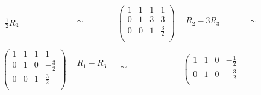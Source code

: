 \documentclass[12pt]{scrartcl}
\begin{document}
\begin{enumerate}
\begin{enumerate}
\begin{equation}
\begin{split}
\begin{array}{cccccc}
\begin{array}{c}
								 \\
					\frac{1}{2}R_3 		\\
					\end{array}
					&
					\begin{array}{c}
					 \\
					 \sim\\
					 \\
					\end{array}
					&
					\left(
					\begin{array}{ccc|c}
						1	&	1	&	1	&	1 \\
						0	&	1	&	3	&	3 \\
						0	&	0	&	1	&	\frac{3}{2}\\
					\end{array}
					\right)
					&
					\begin{array}{c}
								\\
					R_2 - 3R_3			 \\
						\\
					\end{array}
					&
					\begin{array}{c}
					 \\
					 \sim\\
					 \\
					\end{array}
					\\
					\\
					\left(
					\begin{array}{ccc|c}
						1	&	1	&	1	&	1 \\
						0	&	1	&	0	&	-\frac{3}{2} \\
						0	&	0	&	1	&	\frac{3}{2} \\
					\end{array}
					\right)
					&
					\begin{array}{c}
					R_1 - R_3				\\
								 \\
							\\
					\end{array}
					&
					\begin{array}{c}
					 \\
					 \sim\\
					 \\
					\end{array}
					&
					\left(
					\begin{array}{ccc|c}
						1	&	1	&	0	&	-\frac{1}{2} \\
						0	&	1	&	0	&	-\frac{3}{2} \\

\end{array}
\end{array}
\end{split}
\end{equation}
\end{enumerate}
\end{enumerate}
\end{document}
